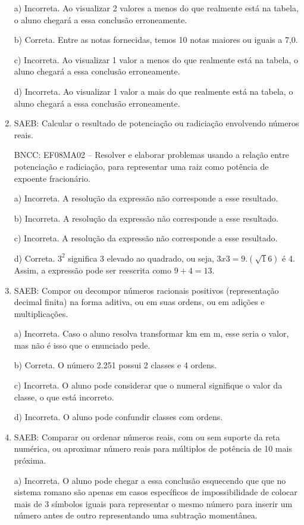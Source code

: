 \begin{enumerate}
a) Incorreta. Ao visualizar 2 valores a menos do que realmente
está na tabela, o aluno chegará a essa conclusão erroneamente.

b) Correta. Entre as notas fornecidas, temos 10 notas maiores ou
iguais a 7,0.

c) Incorreta. Ao visualizar 1 valor a menos do que realmente está
na tabela, o aluno chegará a essa conclusão erroneamente.

d) Incorreta. Ao visualizar 1 valor a mais do que realmente está
na tabela, o aluno chegará a essa conclusão erroneamente.

\item SAEB: Calcular o resultado de potenciação ou radiciação envolvendo
números reais.

BNCC: EF08MA02 -- Resolver e elaborar problemas usando a relação entre
potenciação e radiciação, para representar uma raiz como potência de
expoente fracionário.

a) Incorreta. A resolução da expressão não corresponde
a esse resultado.

b) Incorreta. A resolução da expressão não corresponde
a esse resultado.

c) Incorreta. A resolução da expressão não corresponde
a esse resultado.

d) Correta. $3^2$ significa 3 elevado ao quadrado, ou seja,
$3 x 3 = 9. (\sqrt 16)$ é 4. Assim, a expressão pode ser reescrita como
$9 + 4 = 13$.

\item SAEB: Compor ou decompor números racionais positivos (representação
decimal finita) na forma aditiva, ou em suas ordens, ou em adições e
multiplicações.

a) Incorreta. Caso o aluno resolva transformar km em m, esse seria
o valor, mas não é isso que o enunciado pede.

b) Correta. O número 2.251 possui 2 classes e 4 ordens.

c) Incorreta. O aluno pode considerar que o numeral signifique o
valor da classe, o que está incorreto.

d) Incorreta. O aluno pode confundir classes com ordens.

\item SAEB: Comparar ou ordenar números reais, com ou sem suporte da reta
numérica, ou aproximar número reais para múltiplos de potência de 10
mais próxima.

a) Incorreta. O aluno pode chegar a essa conclusão esquecendo que
que no sistema romano são apenas em casos específicos de impossibilidade
de colocar mais de 3 símbolos iguais para representar o mesmo número
para inserir um número antes de outro representando uma subtração
momentânea.


\end{enumerate}

